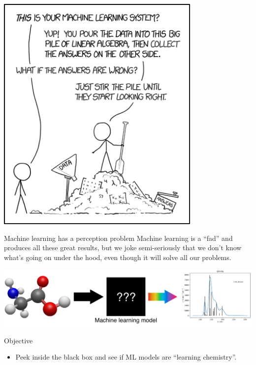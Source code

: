 \documentclass[xetex,compress]{beamer}
\begin{document}
\begin{frame}{}
  \begin{center}
    \includegraphics[width=0.75\textwidth]{./figures/machine_learning.png}
  \end{center}
\end{frame}

\begin{frame}{Machine learning has a perception problem}
  Machine learning is a ``fad'' and produces all these great results, but we joke semi-seriously that we don't know what's going on under the hood, even though it will solve all our problems.
  \begin{center}
    \includegraphics[width=1.00\textwidth]{./figures/black_box_prediction.pdf}
  \end{center}
\end{frame}

\begin{frame}{Objective}
  \begin{itemize}
  \item Peek inside the black box and see if ML models are ``learning chemistry''.
  \end{itemize}
\end{frame}
\end{document}
